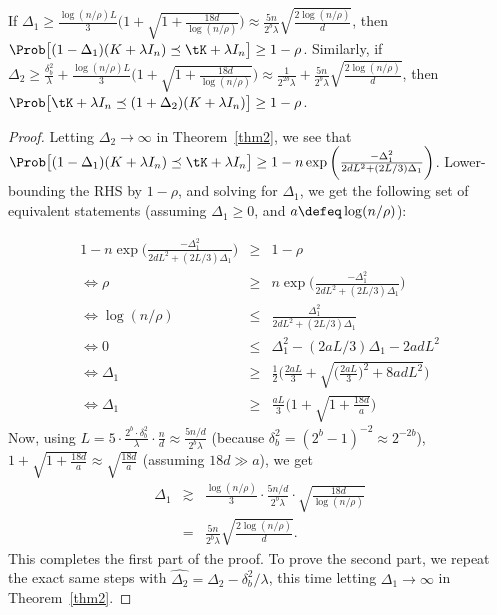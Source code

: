 \begin{corollary}
	If $\Delta_1 \geq \frac{\log(n/\rho)L}{3}\Big(1+\sqrt{1+\frac{18d}{\log(n/\rho)}}\Big) \approx \frac{5n}{2^b \lambda}\sqrt{\frac{2\log(n/\rho)}{d}}$,
	then $\Prob\big[(1 - \Delta_1) (K + \lambda I_n) \preceq \tK + \lambda I_n \big] \geq  1 - \rho$. 
	Similarly, if $\Delta_2 \geq \frac{\delta_b^2}{\lambda} +  \frac{\log(n/\rho)L}{3}\Big(1+\sqrt{1+\frac{18d}{\log(n/\rho)}}\Big) \approx \frac{1}{2^{2b}\lambda} + \frac{5n}{2^b \lambda}\sqrt{\frac{2\log(n/\rho)}{d}}$,
	then $\Prob\big[\tK + \lambda I_n \preceq (1 + \Delta_2) (K + \lambda I_n)\big] \geq  1 - \rho$. 
\end{corollary}

\begin{proof}
Letting $\Delta_2 \rightarrow \infty$ in Theorem~\ref{thm2}, we see that 
$\Prob\big[(1 - \Delta_1) (K + \lambda I_n) \preceq \tK + \lambda I_n \big] \geq 1 - n \exp \bigg(\frac{-\Delta_1^2}{2dL^2 + (2L/3)\Delta_1}\bigg)$.
Lower-bounding the RHS by $1-\rho$, and solving for $\Delta_1$, we get the following set of equivalent statements (assuming $\Delta_1 \geq 0$, and $a\defeq \log(n/\rho)$):

\begin{eqnarray*}
1 - n \exp \bigg(\frac{-\Delta_1^2}{2dL^2 + (2L/3)\Delta_1}\bigg) &\geq& 1-\rho \\
\Longleftrightarrow \rho &\geq& n \exp \bigg(\frac{-\Delta_1^2}{2dL^2 + (2L/3)\Delta_1}\bigg) \\
\Longleftrightarrow \log(n/\rho) &\leq& \frac{\Delta_1^2}{2dL^2 + (2L/3)\Delta_1} \\
\Longleftrightarrow 0 &\leq&  \Delta_1^2 - (2aL/3)\Delta_1 - 2adL^2 \\
\Longleftrightarrow \Delta_1 &\geq&  \frac{1}{2}\bigg(\frac{2aL}{3} + \sqrt{\Big(\frac{2aL}{3}\Big)^2 + 8adL^2}\bigg) \\
\Longleftrightarrow \Delta_1 &\geq& \frac{aL}{3}\bigg(1 + \sqrt{1 + \frac{18d}{a}}\bigg)
\end{eqnarray*}
Now, using $L = 5 \cdot \frac{2^b \cdot \delta_b^2}{\lambda}\cdot  \frac{n}{d} \approx \frac{5n/d}{2^b \lambda}$ (because $\delta_b^2 = (2^b-1)^{-2} \approx 2^{-2b}$), $1 + \sqrt{1 + \frac{18d}{a}} \approx \sqrt{\frac{18d}{a}}$ (assuming $18d \gg a$), we get
\begin{eqnarray*}
	\Delta_1 &\gtrsim& \frac{\log(n/\rho)}{3}\cdot \frac{5n/d}{2^b \lambda}\cdot \sqrt{\frac{18d}{\log(n/\rho)}} \\
	&=& \frac{5n}{2^b \lambda}\sqrt{\frac{2\log(n/\rho)}{d}}.
\end{eqnarray*}
This completes the first part of the proof.
To prove the second part, we repeat the exact same steps with $\widehat{\Delta_2} = \Delta_2 - \delta_b^2/\lambda$, this time letting $\Delta_1 \rightarrow \infty$ in Theorem~\ref{thm2}.

\end{proof}

